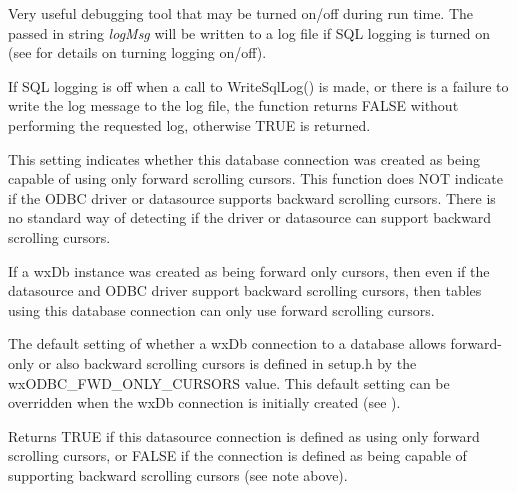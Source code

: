 \label{wxdbwritesqllog}





Very useful debugging tool that may be turned on/off during run time.  The
passed in string {\it logMsg} will be written to a log file if SQL logging
is turned on (see  for details on turning logging on/off).


If SQL logging is off when a call to WriteSqlLog() is made, or there is a
failure to write the log message to the log file, the function returns
FALSE without performing the requested log, otherwise TRUE is returned.



\label{wxdbisfwdonlycursors}



This setting indicates whether this database connection was created
as being capable of using only forward scrolling cursors.  This function
does NOT indicate if the ODBC driver or datasource supports backward
scrolling cursors.  There is no standard way of detecting if the driver
or datasource can support backward scrolling cursors.

If a wxDb instance was created as being forward only cursors, then even if
the datasource and ODBC driver support backward scrolling cursors, then
tables using this database connection can only use forward scrolling
cursors.

The default setting of whether a wxDb connection to a database allows
forward-only or also backward scrolling cursors is defined in setup.h by 
the wxODBC_FWD_ONLY_CURSORS value.  This default setting can be overridden
when the wxDb connection is initially created (see ).


Returns TRUE if this datasource connection is defined as using only forward
scrolling cursors, or FALSE if the connection is defined as being capable
of supporting backward scrolling cursors (see note above).

